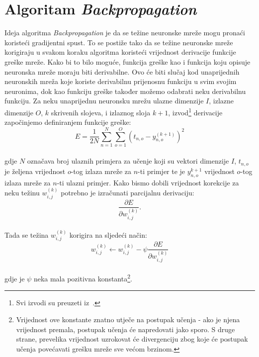 \section{Algoritam \emph{Backpropagation}}
\label{sec:algoritam-backpropagation}
Ideja algoritma \emph{Backpropagation} je da se težine neuronske mreže mogu pronaći koristeći gradijentni spust. To se
postiže tako da se težine neuronske mreže korigiraju u svakom koraku algoritma koristeći vrijednost derivacije funkcije
greške mreže. Kako bi to bilo moguće, funkcija greške kao i funkcija koju opisuje neuronska mreže moraju biti
derivabilne. Ovo će biti slučaj kod unaprijednih neuronskih mreža koje koriste derivabilnu prijenosnu funkciju u svim
svojim neuronima, dok kao funkciju greške također možemo odabrati neku derivabilnu funkciju. Za neku unaprijednu
neuronsku mrežu ulazne dimenzije $I$, izlazne dimenzije $O$, $k$ skrivenih slojeva, i izlaznog sloja $k + 1$,
izvod\footnote{Svi izvodi su preuzeti iz\ \citep{cupic2013}.} derivacije započinjemo definiranjem funkcije greške:\\
\begin{equation*}
    E = \frac{1}{2N} \sum_{n = 1}^{N} \sum_{o = 1}^{O} \left(t_{n, o} - y_{n, o}^{(k + 1)}\right)^2
\end{equation*}
\\
gdje $N$ označava broj ulaznih primjera za učenje koji su vektori dimenzije $I$, $t_{n, o}$ je željena vrijednost
$o$-tog izlaza mreže za $n$-ti primjer te je $y_{n, o}^{k + 1}$ vrijednost $o$-tog izlaza mreže za $n$-ti ulazni
primjer. Kako bismo dobili vrijednost korekcije za neku težinu $w_{i, j}^{(k)}$ potrebno je izračunati parcijalnu
derivaciju:\\
\begin{equation*}
    \frac{\partial E}{\partial w_{i, j}^{(k)}}.
\end{equation*}
\\
Tada se težina $w_{i, j}^{(k)}$ korigira na sljedeći način:\\
\begin{equation*}
    w_{i, j}^{(k)} \leftarrow w_{i, j}^{(k)} - \psi \frac{\partial E}{\partial w_{i, j}^{(k)}}
\end{equation*}
\\
gdje je $\psi$ neka mala pozitivna konstanta\footnote{Vrijednost ove konstante znatno utječe na postupak učenja - ako je
njena vrijednost premala, postupak učenja će napredovati jako sporo. S druge strane, prevelika vrijednost uzrokovat će
divergenciju zbog koje će postupak učenja povećavati grešku mreže sve većom brzinom.}.

